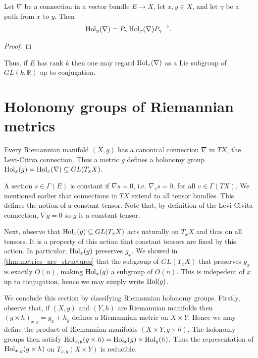 \documentclass{article}
\begin{document}
\begin{lemma}
  Let $\nabla$ be a connection in a vector bundle $E\to X$, let $x,y\in X$,
  and let $\gamma$ be a path from $x$ to $y$. Then
  \begin{align*}
    \operatorname{Hol}_y(\nabla)=P_\gamma \operatorname{Hol}_x(\nabla){P_\gamma}^{-1}.
  \end{align*}
  \begin{proof}

    \missingproof
  \end{proof}
\end{lemma}

Thus, if $E$ has rank $k$ then one may regard $\operatorname{Hol}_x(\nabla)$ as
a Lie subgroup of $GL(k,\mathbb{R})$ up to conjugation.

\section{Holonomy groups of Riemannian metrics}

Every Riemannian manifold $(X,g)$ has a canonical connection
$\nabla$ in $TX$, the Levi-Citiva connection. Thus a metric $g$
defines a holonomy group $\operatorname{Hol}_x(g) = \operatorname{Hol}_x(\nabla)\subseteq GL(T_x X)$.

A section $s\in\Gamma(E)$ is constant if $\nabla s = 0$, i.e. $\nabla_v s=0$, for all $v\in\Gamma(TX)$. We mentioned earlier that connections in
$TX$ extend to all tensor bundles. This defines the notion of a constant
tensor. Note that, by definition of the Levi-Civita connection,
$\nabla g = 0$ so $g$ is a constant tensor.

Next, observe that $\operatorname{Hol}_x(g)\subseteq GL(T_x X)$ acts naturally
on $T_x X$ and thus on all tensors. It is a property of this action that
constant tensors are fixed by this action. In particular,
$\operatorname{Hol}_x(g)$ preserves $g_x$. We showed in \ref{thm:metrics_are_structures} that the subgroup of $GL(T_x X)$ that preserves $g_x$ is exactly
$O(n)$, making $\operatorname{Hol}_x(g)$ a subgroup of $O(n)$. This is indepedent of
$x$ up to conjugation, hence we may simply write $\operatorname{Hol}(g)$.

We conclude this section by classifying Riemannian holonomy groups.
Firstly, observe that, if $(X,g)$ and $(Y,h)$ are Riemannian
manifolds then $(g\times h)_{x,y} = g_x + h_y$ defines a Riemannian
metric on $X\times Y$. Hence we may define
the product of Riemannian manifolds $(X\times Y,g\times h)$.
The holonomy groups then satisfy $\operatorname{Hol}_{x,y}(g\times
h)=\operatorname{Hol}_x(g)\times\operatorname{Hol}_y(h)$. Thus the representation of
$\operatorname{Hol}_{x,y}(g\times h)$ on $T_{x,y}(X\times Y)$ is reducible.
\end{document}

